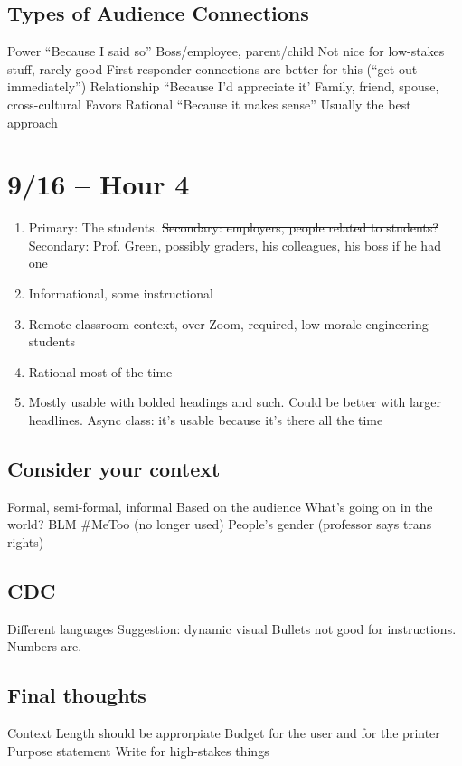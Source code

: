 \subsection{Types of Audience Connections}

\begin{outline}
    \1 Power 
        \2 ``Because I said so''
        \2 Boss/employee, parent/child 
        \2 Not nice for low-stakes stuff, rarely good
        \2 First-responder connections are better for this (``get out immediately'')
    \1 Relationship 
        \2 ``Because I'd appreciate it'
        \2 Family, friend, spouse, cross-cultural
        \2 Favors
    \1 Rational 
        \2 ``Because it makes sense''
        \2 Usually the best approach
\end{outline}

\section{9/16 -- Hour 4}

\begin{enumerate}
    \item Primary: The students. \st{Secondary: employers, people related to students?} Secondary: Prof. Green, possibly graders, his colleagues, his boss if he had one
    \item Informational, some instructional
    \item Remote classroom context, over Zoom, required, low-morale engineering students
    \item Rational most of the time 
    \item Mostly usable with bolded headings and such. Could be better with larger headlines. Async class: it's usable because it's there all the time
\end{enumerate}

\subsection{Consider your context}

\begin{outline}
    \1 Formal, semi-formal, informal 
    \1 Based on the audience 
    \1 What's going on in the world?
        \2 BLM 
        \2 \#MeToo (no longer used)
        \2 People's gender (professor says trans rights)
\end{outline}

\subsection{CDC}
\begin{outline}
    \1 Different languages 
    \1 Suggestion: dynamic visual
    \1 Bullets not good for instructions. Numbers are.
\end{outline}

\subsection{Final thoughts}

\begin{outline}
    \1 Context
        \2 Length should be approrpiate 
        \2 Budget for the user and for the printer
    \1 Purpose statement 
        \2 Write for high-stakes things 
\end{outline}

